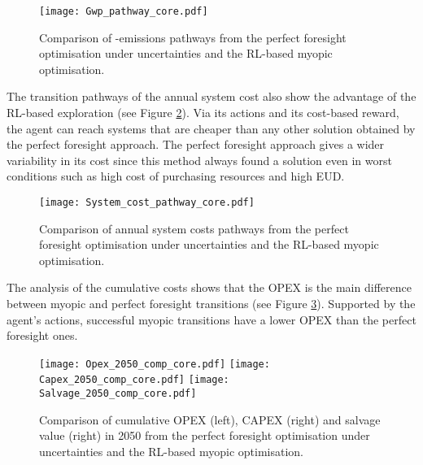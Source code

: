 \begin{figure}[!htbp]
\centering
\texttt{[image: Gwp\_pathway\_core.pdf]}
\caption{Comparison of -emissions pathways from the perfect foresight optimisation under uncertainties and the \gls{RL}-based myopic optimisation. }
\label{fig:Gwp_pathway}
\end{figure}

The transition pathways of the annual system cost also show the advantage of the \gls{RL}-based exploration (see Figure \ref{fig:System_cost_pathway}). Via its actions and its cost-based reward, the agent can reach systems that are cheaper than any other solution obtained by the perfect foresight approach. The perfect foresight approach gives a wider variability in its cost since this method always found a solution even in worst conditions such as high cost of purchasing resources and high \gls{EUD}. 

\begin{figure}[!htbp]
\centering
\texttt{[image: System\_cost\_pathway\_core.pdf]}
\caption{Comparison of annual system costs pathways from the perfect foresight optimisation under uncertainties and the \gls{RL}-based myopic optimisation.}
\label{fig:System_cost_pathway}
\end{figure}

The analysis of the cumulative costs shows that the \gls{OPEX} is the main difference between myopic and perfect foresight transitions (see Figure \ref{fig:Opex_Capex_Salvage_comp}). Supported by the agent's actions, successful myopic transitions have a lower \gls{OPEX} than the perfect foresight ones.

\begin{figure}[!htbp]
\centering
\texttt{[image: Opex\_2050\_comp\_core.pdf]}
\texttt{[image: Capex\_2050\_comp\_core.pdf]}
\texttt{[image: Salvage\_2050\_comp\_core.pdf]}
\caption{Comparison of cumulative OPEX (left), CAPEX (right) and salvage value (right) in 2050 from the perfect foresight optimisation under uncertainties and the \gls{RL}-based myopic optimisation.}
\label{fig:Opex_Capex_Salvage_comp}
\end{figure}

